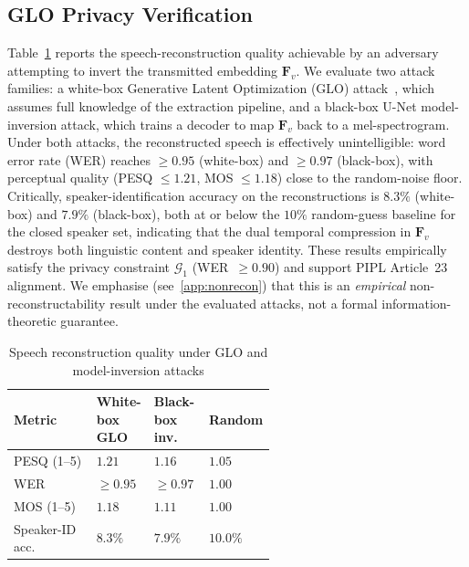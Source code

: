 \documentclass[final,5p,times,number]{elsarticle}
\begin{document}
\subsection{GLO Privacy Verification}\label{sec:glo}

Table~\ref{tab:privacy_attack-en} reports the speech-reconstruction quality achievable by an adversary attempting to invert the transmitted embedding $\bm{F}_v$. We evaluate two attack families: a white-box Generative Latent Optimization (GLO) attack~\cite{23}, which assumes full knowledge of the extraction pipeline, and a black-box U-Net model-inversion attack, which trains a decoder to map $\bm{F}_v$ back to a mel-spectrogram. Under both attacks, the reconstructed speech is effectively unintelligible: word error rate (WER) reaches $\ge 0.95$ (white-box) and $\ge 0.97$ (black-box), with perceptual quality (PESQ $\le 1.21$, MOS $\le 1.18$) close to the random-noise floor. Critically, speaker-identification accuracy on the reconstructions is $8.3\%$ (white-box) and $7.9\%$ (black-box), both at or below the $10\%$ random-guess baseline for the closed speaker set, indicating that the dual temporal compression in $\bm{F}_v$ destroys both linguistic content and speaker identity. These results empirically satisfy the privacy constraint $\mathcal{G}_1$ (WER~$\ge 0.90$) and support PIPL Article~23 alignment. We emphasise (see~\ref{app:nonrecon}) that this is an \emph{empirical} non-reconstructability result under the evaluated attacks, not a formal information-theoretic guarantee.

\begin{table}[!t]
\centering
\caption{Speech reconstruction quality under GLO and model-inversion attacks}
\label{tab:privacy_attack-en}
\small
\renewcommand{\arraystretch}{1.2}
\begin{tabular}{l>{\centering\arraybackslash}p{0.21\linewidth}>{\centering\arraybackslash}p{0.21\linewidth}>{\centering\arraybackslash}p{0.15\linewidth}}
\toprule
\textbf{Metric} & \textbf{White-box GLO} & \textbf{Black-box inv.} & \textbf{Random} \\
\midrule
PESQ (1--5) & $1.21$ & $1.16$ & $1.05$ \\
WER & $\ge 0.95$ & $\ge 0.97$ & $1.00$ \\
MOS (1--5) & $1.18$ & $1.11$ & $1.00$ \\
Speaker-ID acc. & $8.3\%$ & $7.9\%$ & $10.0\%$ \\
\bottomrule
\end{tabular}
\end{table}
\end{document}
